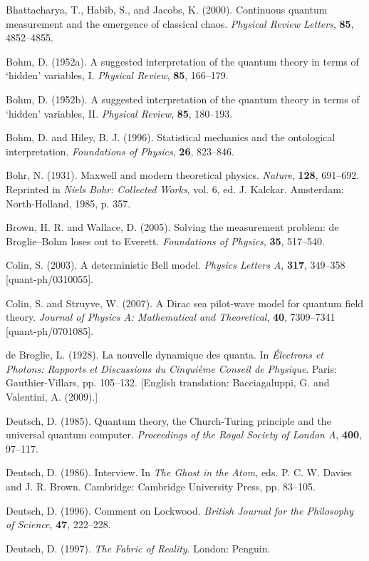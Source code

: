 \documentclass{article}%
\begin{document}
Bhattacharya, T., Habib, S., and Jacobs, K. (2000). Continuous quantum
measurement and the emergence of classical chaos. \textit{Physical Review
Letters}, \textbf{85}, 4852--4855.

Bohm, D. (1952a). A suggested interpretation of the quantum theory in terms of
`hidden' variables, I. \textit{Physical Review}, \textbf{85}, 166--179.

Bohm, D. (1952b). A suggested interpretation of the quantum theory in terms of
`hidden' variables, II. \textit{Physical Review}, \textbf{85}, 180--193.

Bohm, D. and Hiley, B. J. (1996). Statistical mechanics and the ontological
interpretation. \textit{Foundations of Physics}, \textbf{26}, 823--846.

Bohr, N. (1931). Maxwell and modern theoretical physics. \textit{Nature},
\textbf{128}, 691--692. Reprinted in \textit{Niels Bohr: Collected Works},
vol. 6, ed. J. Kalckar. Amsterdam: North-Holland, 1985, p. 357.

Brown, H. R. and Wallace, D. (2005). Solving the measurement problem: de
Broglie--Bohm loses out to Everett. \textit{Foundations of Physics},
\textbf{35}, 517--540.

Colin, S. (2003). A deterministic Bell model. \textit{Physics Letters A},
\textbf{317}, 349--358 [quant-ph/0310055].

Colin, S. and Struyve, W. (2007). A Dirac sea pilot-wave model for quantum
field theory. \textit{Journal of Physics A: Mathematical and Theoretical},
\textbf{40}, 7309--7341 [quant-ph/0701085].

de Broglie, L. (1928). La nouvelle dynamique des quanta. In
\textit{\'{E}lectrons et Photons: Rapports et Discussions du Cinqui\`{e}me
Conseil de Physique}. Paris: Gauthier-Villars, pp. 105--132. [English
translation: Bacciagaluppi, G. and Valentini, A. (2009).]

Deutsch, D. (1985). Quantum theory, the Church-Turing principle and the
universal quantum computer. \textit{Proceedings of the Royal Society of London
A}, \textbf{400}, 97--117.

Deutsch, D. (1986). Interview. In \textit{The Ghost in the Atom}, eds. P. C.
W. Davies and J. R. Brown. Cambridge: Cambridge University Press, pp. 83--105.

Deutsch, D. (1996). Comment on Lockwood. \textit{British Journal for the
Philosophy of Science}, \textbf{47}, 222--228.

Deutsch, D. (1997). \textit{The Fabric of Reality}. London: Penguin.
\end{document}
